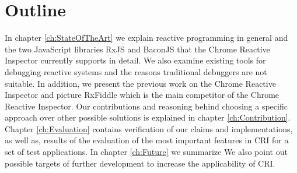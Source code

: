 \section{Outline}
In chapter \ref{ch:StateOfTheArt} we explain reactive programming in general and the two JavaScript libraries RxJS and BaconJS that the Chrome Reactive Inspector currently supports in detail. We also examine existing tools for debugging reactive systems and the reasons traditional debuggers are not suitable. In addition, we present the previous work on the Chrome Reactive Inspector and picture RxFiddle which is the main competitor of the Chrome Reactive Inspector.
Our contributions and reasoning behind choosing a specific approach over other possible solutions is explained in chapter \ref{ch:Contribution}.
Chapter \ref{ch:Evaluation} contains verification of our claims and implementations, as well as, results of the evaluation of the most important features in CRI for a set of test applications.
In chapter \ref{ch:Future} we summarize  We also point out possible targets of further development to increase the applicability of CRI.
